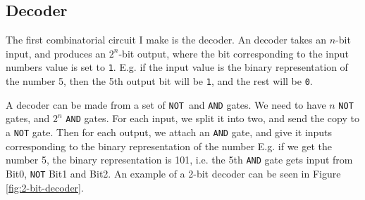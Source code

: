 \subsection{Decoder}
The first combinatorial circuit I make is the decoder. An decoder takes an
$n$-bit input, and produces an $2^n$-bit output, where the bit corresponding to
the input numbers value is set to \texttt{1}. E.g. if the input value is the
binary representation of the number 5, then the 5th output bit will be
\texttt{1}, and the rest will be \texttt{0}.

A decoder can be made from a set of \texttt{NOT} and \texttt{AND} gates. We
need to have $n$ \texttt{NOT} gates, and $2^n$ \texttt{AND} gates. For each
input, we split it into two, and send the copy to a \texttt{NOT} gate. Then for
each output, we attach an \texttt{AND} gate, and give it inputs corresponding
to the binary representation of the number %
E.g. if we get the number 5, the binary representation is 101, i.e. the 5th
\texttt{AND} gate gets input from Bit0, \texttt{NOT} Bit1 and Bit2. An example
of a 2-bit decoder can be seen in Figure \ref{fig:2-bit-decoder}.

